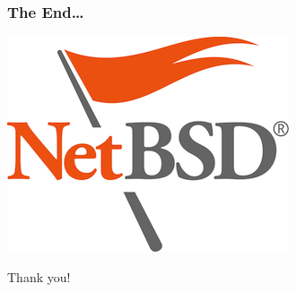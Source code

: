 \documentclass[dvipsnames,table]{beamer}
\begin{document}
\begin{frame}
\frametitle{The End\ldots}
\vspace*{-0.8cm}
\begin{center}
\includegraphics[scale=0.5]{NetBSD.png}

Thank you!
\end{center}
\end{frame}

 
\end{document}
